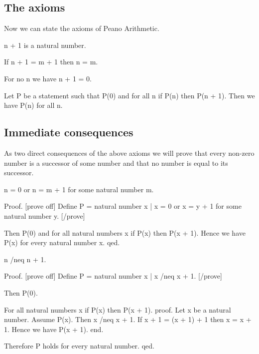 \subsection{The axioms}
Now we can state the axioms of Peano Arithmetic.

\begin{forthel}
\begin{axiom}[0105]
n + 1 is a natural number.
\end{axiom}

\begin{axiom}[0106]
If n + 1 = m + 1 then n = m.
\end{axiom}

\begin{axiom}[0107]
For no n we have n + 1 = 0.
\end{axiom}

\begin{axiom}[0108]
Let P be a statement such that P(0) and for all n if P(n) then
P(n + 1). Then we have P(n) for all n.
\end{axiom}
\end{forthel}

\subsection{Immediate consequences}
As two direct consequences of the above axioms we will prove that every non-zero
number is a successor of some number and that no number is equal to its successor.

\begin{forthel}
\begin{proposition}[0109]
n = 0 or n = m + 1 for some natural number m.

Proof.
  [prove off]
  Define P = {natural number x | x = 0 or x = y + 1 for some natural number y}.
  [/prove]

  Then P(0) and for all natural numbers x if P(x) then P(x + 1). Hence we
  have P(x) for every natural number x.
qed.
\end{proposition}

\begin{proposition}[0110]
n /neq n + 1.

Proof.
  [prove off]
  Define P = {natural number x | x /neq x + 1}.
  [/prove]

  Then P(0).

  For all natural numbers x if P(x) then P(x + 1).
  proof.
    Let x be a natural number. Assume P(x). Then x /neq x + 1. If x + 1 =
    (x + 1) + 1 then x = x + 1. Hence we have P(x + 1).
  end.

  Therefore P holds for every natural number.
qed.
\end{proposition}
\end{forthel}

